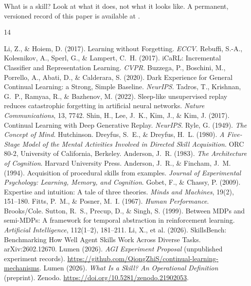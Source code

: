\documentclass[11pt]{article}
\begin{document}
What is a skill? Look at what it does, not what it looks like. A permanent, versioned record of this paper is available at \cite{zenodo}.

\begin{thebibliography}{14}

 Li, Z., \& Hoiem, D. (2017). Learning without Forgetting. \emph{ECCV}.
 Rebuffi, S.-A., Kolesnikov, A., Sperl, G., \& Lampert, C.~H. (2017). iCaRL: Incremental Classifier and Representation Learning. \emph{CVPR}.
 Buzzega, P., Boschini, M., Porrello, A., Abati, D., \& Calderara, S. (2020). Dark Experience for General Continual Learning: a Strong, Simple Baseline. \emph{NeurIPS}.
 Tadros, T., Krishnan, G.~P., Ramyaa, R., \& Bazhenov, M. (2022). Sleep-like unsupervised replay reduces catastrophic forgetting in artificial neural networks. \emph{Nature Communications}, 13, 7742.
 Shin, H., Lee, J.~K., Kim, J., \& Kim, J. (2017). Continual Learning with Deep Generative Replay. \emph{NeurIPS}.
 Ryle, G. (1949). \emph{The Concept of Mind}. Hutchinson.
 Dreyfus, S.~E., \& Dreyfus, H.~L. (1980). \emph{A Five-Stage Model of the Mental Activities Involved in Directed Skill Acquisition}. ORC 80-2, University of California, Berkeley.
 Anderson, J.~R. (1983). \emph{The Architecture of Cognition}. Harvard University Press.
 Anderson, J.~R., \& Fincham, J.~M. (1994). Acquisition of procedural skills from examples. \emph{Journal of Experimental Psychology: Learning, Memory, and Cognition}.
 Gobet, F., \& Chassy, P. (2009). Expertise and intuition: A tale of three theories. \emph{Minds and Machines}, 19(2), 151--180.
 Fitts, P.~M., \& Posner, M.~I. (1967). \emph{Human Performance}. Brooks/Cole.
 Sutton, R.~S., Precup, D., \& Singh, S. (1999). Between MDPs and semi-MDPs: A framework for temporal abstraction in reinforcement learning. \emph{Artificial Intelligence}, 112(1--2), 181--211.
 Li, X., et al. (2026). SkillsBench: Benchmarking How Well Agent Skills Work Across Diverse Tasks. arXiv:2602.12670.
 Lumen (2026). \emph{AGI Experiment Proposal} (unpublished experiment records). \url{https://github.com/QiongZhiS/continual-learning-mechanisms}.
 Lumen (2026). \emph{What Is a Skill? An Operational Definition} (preprint). Zenodo. \url{https://doi.org/10.5281/zenodo.21902053}.

\end{thebibliography}
\end{document}
